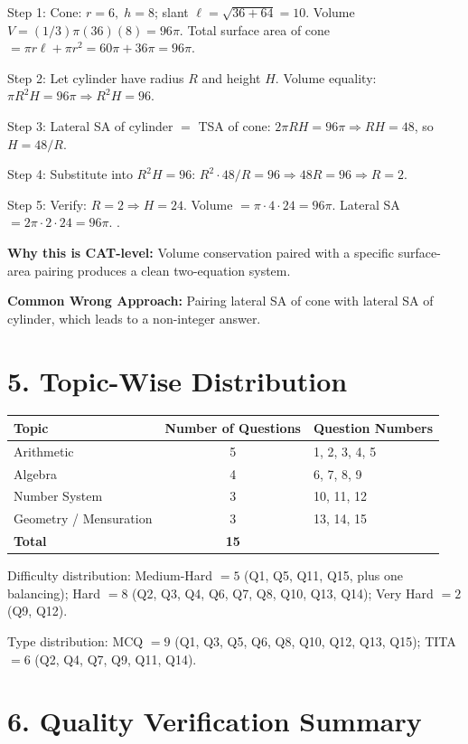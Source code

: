 \documentclass[11pt]{article}
\begin{document}
Step 1: Cone: \(r=6,\;h=8\); slant \(\ell = \sqrt{36+64} = 10\). Volume \(V = (1/3)\pi (36)(8) = 96\pi\). Total surface area of cone \(= \pi r \ell + \pi r^2 = 60\pi + 36\pi = 96\pi\).

Step 2: Let cylinder have radius \(R\) and height \(H\). Volume equality: \(\pi R^2 H = 96\pi \Rightarrow R^2 H = 96\).

Step 3: Lateral SA of cylinder \(=\) TSA of cone: \(2\pi R H = 96\pi \Rightarrow R H = 48\), so \(H = 48/R\).

Step 4: Substitute into \(R^2 H = 96\): \(R^2 \cdot 48/R = 96 \Rightarrow 48 R = 96 \Rightarrow R = 2\).

Step 5: Verify: \(R = 2 \Rightarrow H = 24\). Volume \(= \pi\cdot 4\cdot 24 = 96\pi\). Lateral SA \(= 2\pi\cdot 2\cdot 24 = 96\pi\). \checkmark.

\textbf{Why this is CAT-level:} Volume conservation paired with a specific surface-area pairing produces a clean two-equation system.

\textbf{Common Wrong Approach:} Pairing lateral SA of cone with lateral SA of cylinder, which leads to a non-integer answer.

\newpage
\section*{5. Topic-Wise Distribution}

\begin{longtable}{|l|c|l|}
\hline
\textbf{Topic} & \textbf{Number of Questions} & \textbf{Question Numbers} \\
\hline
Arithmetic & 5 & 1, 2, 3, 4, 5 \\
\hline
Algebra & 4 & 6, 7, 8, 9 \\
\hline
Number System & 3 & 10, 11, 12 \\
\hline
Geometry / Mensuration & 3 & 13, 14, 15 \\
\hline
\textbf{Total} & \textbf{15} & \\
\hline
\end{longtable}

Difficulty distribution: Medium-Hard \(=5\) (Q1, Q5, Q11, Q15, plus one balancing); Hard \(=8\) (Q2, Q3, Q4, Q6, Q7, Q8, Q10, Q13, Q14); Very Hard \(=2\) (Q9, Q12).

Type distribution: MCQ \(=9\) (Q1, Q3, Q5, Q6, Q8, Q10, Q12, Q13, Q15); TITA \(=6\) (Q2, Q4, Q7, Q9, Q11, Q14).

\section*{6. Quality Verification Summary}
\end{document}
